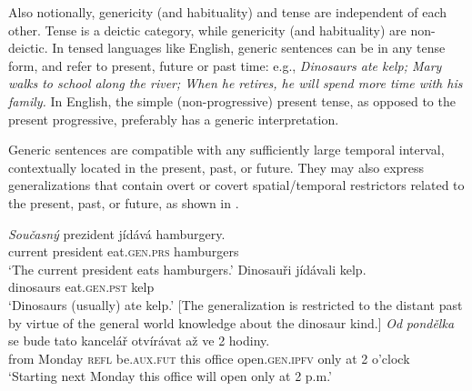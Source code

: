 \documentclass[output=paper,colorlinks,citecolor=brown]{langscibook}
\begin{document}
Also notionally, genericity (and habituality) and tense are independent of each other.  Tense is a deictic category, while genericity (and habituality)
are non-deictic. In tensed languages like English,
generic sentences can be in any tense form, and refer to present, future or past time: e.g., \textit{Dinosaurs ate kelp; Mary walks to school along the river; When he retires, he will spend more time with his family.} In English, the simple (non-progressive) present tense, as opposed to the present progressive, preferably has a generic interpretation.  

Generic sentences are compatible with any sufficiently large temporal interval, contextually located in the present, past, or future. They may also express generalizations that contain overt or covert spatial/temporal restrictors related to the present, past, or future, as shown in .

\ea\label{va-tenses2}
\ea\gll \textit{Současný} prezident jídává hamburgery.\\
current president eat.\textsc{gen.prs} hamburgers\\
\glt `The current president eats hamburgers.'
\ex\gll Dinosauři jídávali kelp.\\
dinosaurs eat.\textsc{gen.pst} kelp\\
\glt `Dinosaurs (usually) ate kelp.' [The generalization is restricted to the distant past by virtue of the general world knowledge about the dinosaur kind.]
\ex\gll \textit{Od} \textit{pondělka} se bude tato kancelář otvírávat až ve 2 hodiny.\\
from Monday \textsc{refl} be.\textsc{aux.fut} this office open.\textsc{gen.ipfv} only at 2 o'clock\\
\glt `Starting next Monday this office will open only at 2 p.m.'
\z\z
\end{document}
